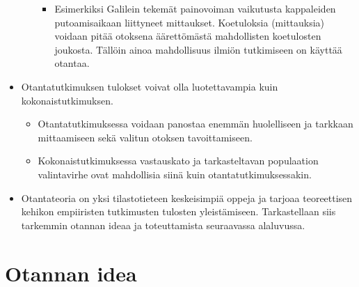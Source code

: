 \documentclass[
]{book}
\providecommand{\tightlist}{%
  \setlength{\itemsep}{0pt}\setlength{\parskip}{0pt}}
\begin{document}
\begin{itemize}
\begin{itemize}
    \begin{itemize}
    \tightlist
    \item
      Esimerkiksi Galilein tekemät painovoiman vaikutusta kappaleiden putoamisaikaan liittyneet mittaukset. Koetuloksia (mittauksia) voidaan pitää otoksena äärettömästä mahdollisten koetulosten joukosta. Tällöin ainoa mahdollisuus ilmiön tutkimiseen on käyttää otantaa.
    \end{itemize}
  \end{itemize}
\item
  Otantatutkimuksen tulokset voivat olla luotettavampia kuin kokonaistutkimuksen.

  \begin{itemize}
  \tightlist
  \item
    Otantatutkimuksessa voidaan panostaa enemmän huolelliseen ja tarkkaan mittaamiseen sekä valitun otoksen tavoittamiseen.
  \item
    Kokonaistutkimuksessa vastauskato ja tarkasteltavan populaation valintavirhe ovat mahdollisia siinä kuin otantatutkimuksessakin.
  \end{itemize}
\item
  Otantateoria on yksi tilastotieteen keskeisimpiä oppeja ja tarjoaa teoreettisen kehikon empiiristen tutkimusten tulosten yleistämiseen. Tarkastellaan siis tarkemmin otannan ideaa ja toteuttamista seuraavassa alaluvussa.
\end{itemize}

\hypertarget{alaluku52}{%
\section{Otannan idea}\label{alaluku52}}
\end{document}
